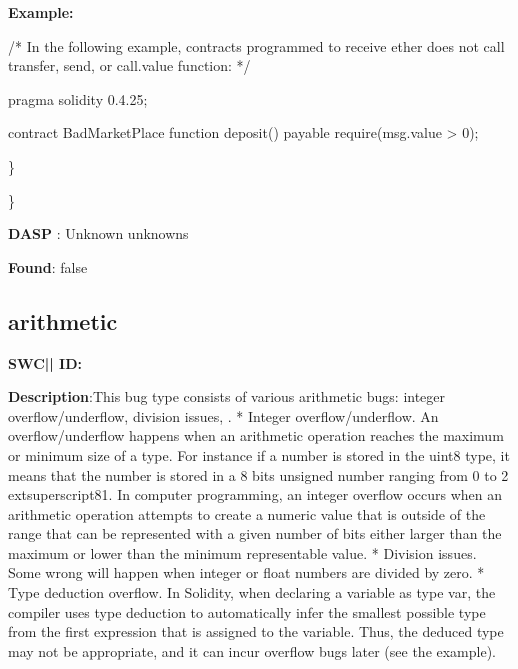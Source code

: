 \documentclass{article}
\begin{document}
\textbf{Example:} 
\begin{ffcode} 

/* In the following example, contracts programmed to receive ether does not call transfer, send, or call.value function: */ 

pragma solidity 0.4.25;

contract BadMarketPlace {
    function deposit() payable {
        require(msg.value > 0);
    }
}

\end{ffcode} 
\} 

\} 

\textbf{DASP} : Unknown unknowns

\textbf{Found}: false

\subsection{arithmetic} 
\textbf{SWC{|\textunderscore| }ID:} 

\textbf{Description}:This bug type consists of various arithmetic bugs: integer overflow/underflow, division issues, .
* Integer overflow/underflow. An overflow/underflow happens when an arithmetic operation reaches the maximum or minimum size of a type. For instance if a number is stored in the uint8 type, it means that the number is stored in a 8 bits unsigned number ranging from 0 to 2{	extsuperscript}8{\textendash}1. In computer programming, an integer overflow occurs when an arithmetic operation attempts to create a numeric value that is outside of the range that can be represented with a given number of bits either larger than the maximum or lower than the minimum representable value.
* Division issues. Some wrong will happen when integer or float numbers are divided by zero.
* Type deduction overflow. In Solidity, when declaring a variable as type var, the compiler uses type deduction to automatically infer the smallest possible type from the first expression that is assigned to the variable. Thus, the deduced type may not be appropriate, and it can incur overflow bugs later (see the example).
\end{document}
